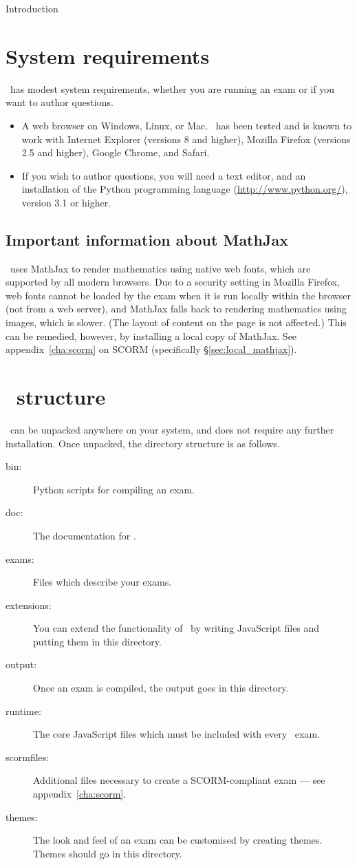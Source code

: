 \begin{chapter}{\label{cha:introduction}Introduction}
  \section{System requirements}
  \numbas\ has modest system requirements, whether you are running an
  exam or if you want to author questions.
  \begin{itemize}
    \item A web browser on Windows, Linux, or Mac.  \numbas\ has been tested
      and is known to work with Internet Explorer (versions 8 and higher),
      Mozilla Firefox (versions 2.5 and higher), Google Chrome, and Safari.
    \item If you wish to author questions, you will need a text editor, and an
      installation of the Python programming language
      (\url{http://www.python.org/}), version 3.1 or higher.
  \end{itemize}
  \subsection{\label{sec:mathjax_fonts}Important information about MathJax}
  \numbas\ uses MathJax to render mathematics using native web fonts, which are
  supported by all modern browsers.  Due to a security setting in Mozilla
  Firefox, web fonts cannot be loaded by the exam when it is run locally within
  the browser (\ie not from a web server), and MathJax falls back to rendering
  mathematics using images, which is slower.  (The layout of content on the
  page is not affected.)  This can be remedied, however, by installing a local
  copy of MathJax.  See appendix~\ref{cha:scorm} on SCORM (specifically
  \S\ref{sec:local_mathjax}).

  \section{\numbas\ structure}
  \numbas\ can be unpacked anywhere on your system, and does not require
  any further installation.  Once unpacked, the directory structure is as follows.
  \begin{description}
    \item[bin:] Python scripts for compiling an exam.
    \item[doc:] The documentation for \numbas.
    \item[exams:] Files which describe your exams.
    \item[extensions:] You can extend the functionality of \numbas\ by writing
      JavaScript files and putting them in this directory.
    \item[output:] Once an exam is compiled, the output goes in this directory.
    \item[runtime:] The core JavaScript files which must be included with every \numbas\ exam.
    \item[scormfiles:] Additional files necessary to create a SCORM-compliant
      exam --- see appendix~\ref{cha:scorm}.
    \item[themes:] The look and feel of an exam can be
      customised by creating themes. Themes should go in this directory.
  \end{description}


\end{chapter}
